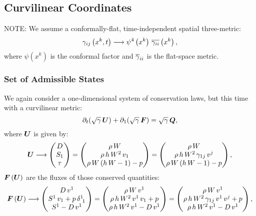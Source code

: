 \documentclass[10pt,preprint]{aastex}
\begin{document}
\newpage


\subsection{Curvilinear Coordinates}
NOTE: We assume a conformally-flat, time-independent spatial three-metric:
\begin{equation}
    \gamma_{ij}\left(x^{k},t\right)\longrightarrow\psi^{4}\left(x^{k}\right)\,\ol{\gamma_{ii}}\left(x^{k}\right),
\end{equation}
where $\psi\left(x^{k}\right)$ is the conformal factor and $\ol{\gamma}_{ii}$ is the flat-space metric.

\subsubsection{Set of Admissible States}
We again consider a one-dimensional system of conservation laws, but this time with a curvilinear metric:
\begin{equation}
    \pd{\left(\sqrtgm\,\bU\right)}{t}+\pd{\left(\sqrtgm\,\bF\right)}{1}=\sqrtgm\,\bQ,
\end{equation}
where $\bU$ is given by:
\begin{equation}
    \bU\longrightarrow\begin{pmatrix} D\\ S_{1}\\ \tau\end{pmatrix}=\begin{pmatrix} \rho\,W\\ \rho\,h\,W^{2}\,v_{1}\\ \rho\,W\left(h\,W-1\right)-p\end{pmatrix}=\begin{pmatrix} \rho\,W\\ \rho\,h\,W^{2}\,\gamma_{1j}\,v^{j}\\ \rho\,W\left(h\,W-1\right)-p\end{pmatrix},
\end{equation}
$\bF\left(\bU\right)$ are the fluxes of those conserved quantities:
\begin{equation}
    \bF\left(\bU\right)\longrightarrow\begin{pmatrix}D\,v^{1}\\ S^{1}\,v_{1}+p\,\delta^{1}_{~1}\\ S^{1}-D\,v^{1}\end{pmatrix}=\begin{pmatrix}\rho\,W\,v^{1}\\ \rho\,h\,W^{2}\,v^{1}\,v_{1}+p\\\rho\,h\,W^{2}\,v^{1}-D\,v^{1}\end{pmatrix}=\begin{pmatrix}\rho\,W\,v^{1}\\ \rho\,h\,W^{2}\,\gamma_{1j}\,v^{1}\,v^{j}+p\\\rho\,h\,W^{2}\,v^{1}-D\,v^{1}\end{pmatrix},
\end{equation}
\end{document}
